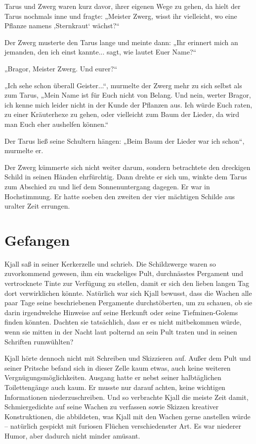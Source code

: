 Tarus und Zwerg waren kurz davor, ihrer eigenen Wege zu gehen, da hielt der Tarus nochmals inne und fragte: „Meister Zwerg, wisst ihr vielleicht, wo eine Pflanze namens ‚Sternkraut‘ wächst?“

Der Zwerg musterte den Tarus lange und meinte dann: „Ihr erinnert mich an jemanden, den ich einst kannte... sagt, wie lautet Euer Name?“

„Bragor, Meister Zwerg. Und eurer?“

„Ich sehe schon überall Geister...“, murmelte der Zwerg mehr zu sich selbst als zum Tarus, „Mein Name ist für Euch nicht von Belang. Und nein, werter Bragor, ich kenne mich leider nicht in der Kunde der Pflanzen aus. Ich würde Euch raten, zu einer Kräuterhexe zu gehen, oder vielleicht zum Baum der Lieder, da wird man Euch eher aushelfen können.“

Der Tarus ließ seine Schultern hängen: „Beim Baum der Lieder war ich schon“, murmelte er.

Der Zwerg kümmerte sich nicht weiter darum, sondern betrachtete den dreckigen Schild in seinen Händen ehrfürchtig. Dann drehte er sich um, winkte dem Tarus zum Abschied zu und lief dem Sonnenuntergang dagegen. Er war in Hochstimmung. Er hatte soeben den zweiten der vier mächtigen Schilde aus uralter Zeit errungen.








\newpage
\section{Gefangen}




Kjall saß in seiner Kerkerzelle und schrieb. Die Schildzwerge waren so zuvorkommend gewesen, ihm ein wackeliges Pult, durchnässtes Pergament und vertrocknete Tinte zur Verfügung zu stellen, damit er sich den lieben langen Tag dort verwirklichen könnte. Natürlich war sich Kjall bewusst, dass die Wachen alle paar Tage seine beschriebenen Pergamente durchstöberten, um zu schauen, ob sie darin irgendwelche Hinweise auf seine Herkunft oder seine Tiefminen-Golems finden könnten. Dachten sie tatsächlich, dass er es nicht mitbekommen würde, wenn sie mitten in der Nacht laut polternd an sein Pult traten und in seinen Schriften rumwühlten?

Kjall hörte dennoch nicht mit Schreiben und Skizzieren auf. Außer dem Pult und seiner Pritsche befand sich in dieser Zelle kaum etwas, auch keine weiteren Vergnügungsmöglichkeiten. Ausgang hatte er nebst seiner halbtäglichen Toilettengänge auch kaum. Er musste nur darauf achten, keine wichtigen Informationen niederzuschreiben. Und so verbrachte Kjall die meiste Zeit damit, Schmiergedichte auf seine Wachen zu verfassen sowie Skizzen kreativer Konstruktionen, die abbildeten, was Kjall mit den Wachen gerne anstellen würde – natürlich gespickt mit furiosen Flüchen verschiedenster Art. Es war niederer Humor, aber dadurch nicht minder amüsant.



